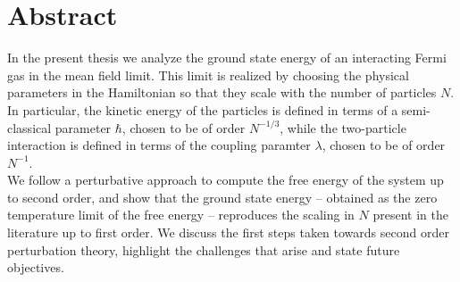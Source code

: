 \chapter*{Abstract}

In the present thesis we analyze the ground state energy of an interacting
Fermi gas in the mean field limit. This limit is realized by choosing the physical parameters
in the Hamiltonian so that they scale with the number of particles $N$. In particular, the
kinetic energy of the particles is defined in terms of a semi-classical parameter $\hbar$,
chosen to be of order $N^{-1/3}$, while the two-particle interaction is defined in terms of
the coupling paramter $\lambda$, chosen to be of order $N^{-1}$.
\\
We follow a perturbative approach to compute the free energy of the system up to second order,
and show that the ground state energy -- obtained as the zero temperature limit of the free
energy -- reproduces the scaling in $N$ present in the literature up to first order. We discuss
the first steps taken towards second order perturbation theory, highlight the challenges that
arise and state future objectives.

